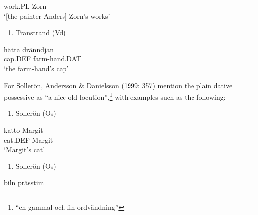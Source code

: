 work.PL  Zorn\\ %


‘[the painter Anders] Zorn’s works’ 
\z


\begin{enumerate} %
\item 
Transtrand (Vd)

\end{enumerate} %
\ea\label{}
\gll hätta  dränndjan\\


cap.DEF  farm-hand.DAT\\ %


‘the farm-hand’s cap’
\z


For Sollerön, Andersson \& Danielsson (1999: 357) mention the plain dative possessive as “a nice old locution”,\footnote{ “en gammal och fin ordvändning”} with examples such as the following:

\begin{enumerate} %
\item 
Sollerön (Os)

\end{enumerate} %
\ea\label{}
\gll katto  Margit\\


cat.DEF  Margit\\ %


‘Margit’s cat’
\z


\begin{enumerate} %
\item 
Sollerön (Os)

\end{enumerate} %
\ea\label{}
\gll biln  prässtim\\


